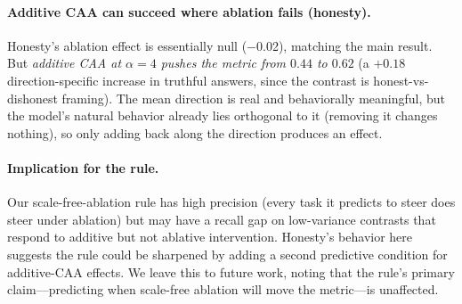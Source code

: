 \documentclass{article}
\begin{document}
\paragraph{Additive CAA can succeed where ablation fails (honesty).}
Honesty's ablation effect is essentially null ($-$0.02), matching
the main result. But \emph{additive CAA at $\alpha=4$ pushes the
metric from $0.44$ to $0.62$} (a $+0.18$ direction-specific increase
in truthful answers, since the contrast is honest-vs-dishonest
framing). The mean direction is real and behaviorally meaningful,
but the model's natural behavior already lies orthogonal to it
(removing it changes nothing), so only adding back along the
direction produces an effect.

\paragraph{Implication for the rule.}
Our scale-free-ablation rule has high precision (every task it
predicts to steer does steer under ablation) but may have a recall
gap on low-variance contrasts that respond to additive but not
ablative intervention. Honesty's behavior here suggests the rule
could be sharpened by adding a second predictive condition for
additive-CAA effects. We leave this to future work, noting that the
rule's primary claim---predicting when scale-free ablation will move
the metric---is unaffected.
\end{document}
